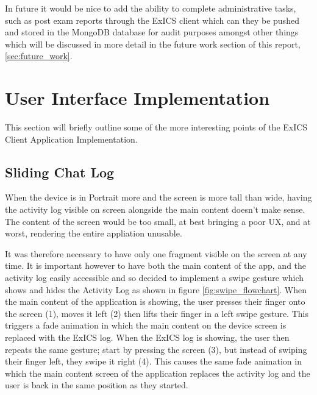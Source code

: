 In future it would be nice to add the ability to complete administrative tasks, such as post exam reports through the ExICS client which can they be pushed and stored in the MongoDB database for audit purposes amongst other things which will be discussed in more detail in the future work section of this report, \ref{sec:future_work}.

\section{User Interface Implementation}
\label{sec:UIimplementation}

This section will briefly outline some of the more interesting points of the ExICS Client Application Implementation.

\subsection{Sliding Chat Log}
\label{subs:chat_log_sliding}

When the device is in Portrait more and the screen is more tall than wide, having the activity log visible on screen alongside the main content doesn't make sense.  The content of the screen would be too small, at best bringing a poor UX, and at worst, rendering the entire appliation unusable.

It was therefore necessary to have only one fragment visible on the screen at any time.  It is important however to have both the main content of the app, and the activity log easily accessible and so decided to implement a swipe gesture which shows and hides the Activity Log as shown in figure \ref{fig:swipe_flowchart}.  When the main content of the application is showing, the user presses their finger onto the screen (1), moves it left (2) then lifts their finger in a left swipe gesture.  This triggers a fade animation in which the main content on the device screen is replaced with the ExICS log.  When the ExICS log is showing, the user then repeats the same gesture; start by pressing the screen (3), but instead of swiping their finger left, they swipe it right (4). This causes the same fade animation in which the main content screen of the application replaces the activity log and the user is back in the same position as they started.

\FloatBarrier

